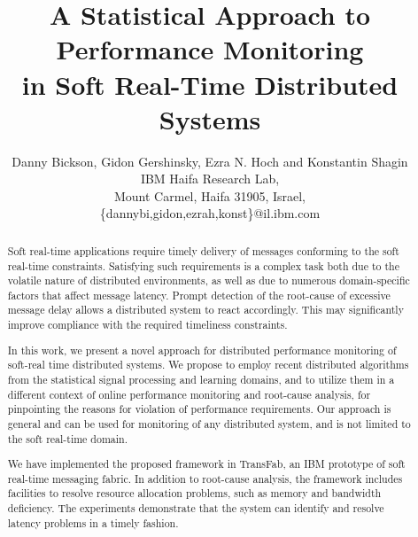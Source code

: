 \documentclass[times, 10pt,twocolumn]{article}
\begin{document}
\title{A Statistical Approach to Performance Monitoring\\
in Soft Real-Time Distributed Systems}

\author{Danny Bickson, Gidon Gershinsky, Ezra N. Hoch and Konstantin Shagin\\
IBM Haifa Research Lab, \\Mount Carmel, Haifa 31905, Israel, \\
\{dannybi,gidon,ezrah,konst\}@il.ibm.com
}

\maketitle
\thispagestyle{empty}




\begin{abstract}
Soft real-time applications require timely delivery of messages conforming to the soft real-time
constraints. Satisfying such requirements is a complex task both due to the volatile nature of distributed environments, as well as due to numerous domain-specific factors that affect message latency.
Prompt detection of the root-cause of excessive message delay allows
a distributed system to react accordingly. This may
significantly improve compliance with the required timeliness constraints.

In this work, we present a novel approach for distributed performance
monitoring of soft-real time distributed systems. We propose to employ recent distributed algorithms from the statistical signal processing and learning domains, and to utilize them in a different context of online performance monitoring and root-cause analysis, for pinpointing the reasons for violation of performance requirements.
Our approach is general and can be used for monitoring of any distributed system, and is not
limited to the soft real-time domain.

We have implemented the proposed framework in TransFab, an IBM prototype of soft real-time messaging fabric.
In addition to root-cause analysis, the framework includes facilities to resolve resource allocation problems, such
as memory and bandwidth deficiency. The experiments demonstrate that the system can
identify and resolve latency problems in a timely fashion.
\end{abstract}



\end{document}
